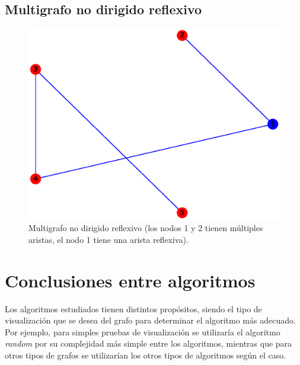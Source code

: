 \documentclass{article}
\begin{document}
\subsection{Multigrafo no dirigido reflexivo}
\begin{figure}[H]
    \includegraphics[width=\textwidth]{9-MNDR}
    \caption{Multigrafo no dirigido reflexivo (los nodos 1 y 2 tienen múltiples aristas, el nodo 1 tiene una arista reflexiva).}
    \label{fig:MNDR}
\end{figure}

\section{Conclusiones entre algoritmos}
Los algoritmos estudiados tienen distintos propósitos, siendo el tipo de visualización que se desea del grafo para determinar el algoritmo más adecuado. Por ejemplo, para simples pruebas de visualización se utilizaría el algoritmo \textit{random} por su complejidad más simple entre los algoritmos, mientras que para otros tipos de grafos se utilizarían los otros tipos de algoritmos según el caso.



\end{document}
